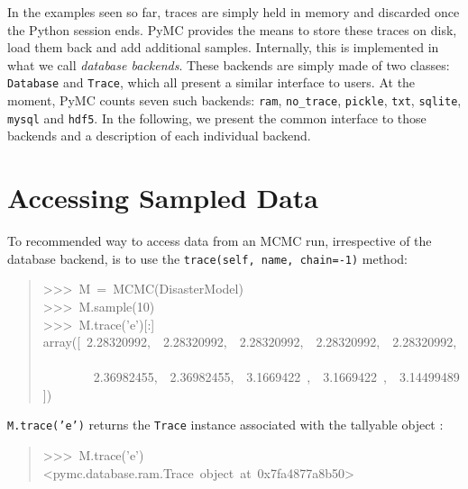 

In the examples seen so far, traces are simply held in memory and discarded once
the Python session ends. PyMC provides the means to store these traces on disk,
load them back and add additional samples. Internally, this is implemented in
what we call \emph{database backends}. These backends are simply made of two classes:
\texttt{Database} and \texttt{Trace}, which all present a similar interface to users.
At the moment, PyMC counts seven such backends: \texttt{ram}, \texttt{no{\_}trace},
\texttt{pickle}, \texttt{txt}, \texttt{sqlite}, \texttt{mysql} and \texttt{hdf5}.
In the following, we present the common interface to those backends and a
description of each individual backend.



\hypertarget{accessing-sampled-data}{}
\section*{Accessing Sampled Data}
\label{accessing-sampled-data}

To recommended way to access data from an MCMC run, irrespective of the
database backend, is to use the \texttt{trace(self, name, chain=-1)} method:
\begin{quote}{\ttfamily \raggedright \noindent
>{}>{}>~M~=~MCMC(DisasterModel)~\\
>{}>{}>~M.sample(10)~\\
>{}>{}>~M.trace('e'){[}:{]}~\\
array({[}~2.28320992,~~2.28320992,~~2.28320992,~~2.28320992,~~2.28320992,~\\
~~~~~~~~2.36982455,~~2.36982455,~~3.1669422~,~~3.1669422~,~~3.14499489{]})
}\end{quote}

\texttt{M.trace('e')} returns the \texttt{Trace} instance associated with the tallyable
object :
\begin{quote}{\ttfamily \raggedright \noindent
>{}>{}>~M.trace('e')~\\
<pymc.database.ram.Trace~object~at~0x7fa4877a8b50>
}\end{quote}

